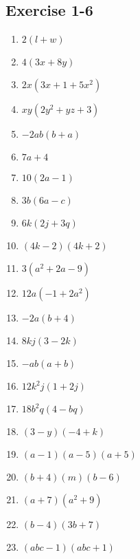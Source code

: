 \subsection{Exercise 1-6} %
\begin{multicols}{2}
\begin{enumerate}[itemsep=5pt, label=\textbf{\arabic*}. ] 
\item $2(l + w)$%
\item $4(3x + 8y)$%
\item $2x(3x + 1 +5x^2)$%
\item $xy(2y^2 + yz + 3)$%
\item $-2ab(b + a)$%
\item $7a + 4$%
\item $10(2a - 1)$%
\item $3b(6a - c)$%
\item $6k(2j + 3q)$%
\item $(4k - 2)(4k + 2)$%
\item $3(a^2 + 2a - 9)$%
\item $12a(-1 + 2a^2)$%
\item $-2a(b + 4)$%
\item $8kj(3 - 2k)$%
\item $-ab(a + b)$%
\item $12k^2j(1 + 2j)$%
\item $18b^2q(4 - bq)$%
\item $(3 - y)(-4 + k)$%
\item $(a - 1)(a - 5)(a + 5)$%
\item $(b + 4)(m)(b - 6)$%
\item $(a + 7)(a^2 + 9)$ %
\item $(b - 4)(3b + 7)$%
\item $(abc - 1)(abc + 1)$%
\end{enumerate}
\end{multicols}


